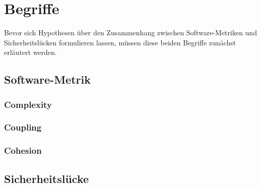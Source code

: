 \section{Begriffe}
\label{sec:begriffe}
Bevor sich Hypothesen über den Zusammenhang zwischen Software-Metriken und Sicherheitslücken formulieren lassen, müssen diese beiden Begriffe zunächst erläutert werden.
\subsection{Software-Metrik}

\subsubsection{Complexity}

\subsubsection{Coupling}

\subsubsection{Cohesion}

\subsection{Sicherheitslücke}



